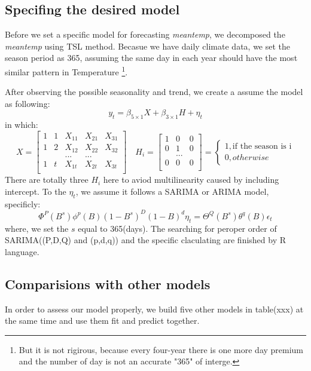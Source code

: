 \documentclass[12pt]{article}
\begin{document}
\subsection{Specifing the desired model}
Before we set a specific model for forecasting \textit{meantemp}, 
we decomposed the \textit{meantemp} using TSL method\cite{fpp3stl}. Becasue
we have daily climate data, we set the season period as 365, assuming 
the same day in each year should have the most similar pattern in Temperature
\footnote{But it is not rigirous, because every 
four-year there is one more day premium and the number of day
is not an accurate "365" of interge.}.

After observing the possible seasonality and trend, we create a assume the model as following:
\[
y_t = \beta_{5 \times 1} X + \beta_{3 \times 1} H + \eta_t
\]
in which:
\[
X = \begin{bmatrix}
    1 & 1 & X_{11} & X_{21} & X_{31}\\
    1 & 2 & X_{12} & X_{22} & X_{32}\\
    & & ... & ... &\\
    1 & t & X_{1t} & X_{2t} & X_{3t} \\
    \end{bmatrix}
\quad H_i = 
\begin{bmatrix}
    1 & 0 & 0\\
    0 & 1 & 0\\
     & ... & \\
    0 & 0 & 0 \\
    \end{bmatrix} =
\begin{cases}
    1, \text{if the season is i} \\
    0, other wise
\end{cases}
\]
There are totally three $H_i$ here to aviod multilinearity 
caused by including intercept. To the $\eta_t$, we assume it follows
a SARIMA or ARIMA model, specificly:
\[
\Phi^P(B^s) \phi^p(B) (1-B^s)^D (1-B)^d \eta_t = 
\Theta^Q(B^s) \theta^q(B) \epsilon_t
\]
where, we set the $s$ equal to 365(days). The searching for peroper order  
of SARIMA((P,D,Q) and (p,d,q)) and the specific claculating are finished
by R language.

\subsection{Comparisions with other models}
In order to assess our model properly, we build five other models 
in table(xxx) at the same time and use them fit and predict together.
\end{document}
